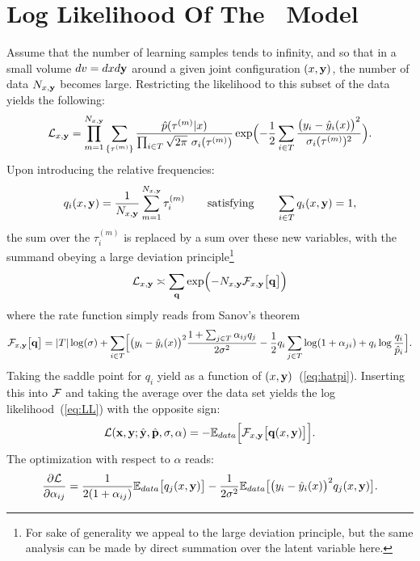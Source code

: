 \chapter{Log Likelihood Of The \XX \ Model}\label{app:LL}
Assume that the number of learning samples tends to infinity, and so that in a small volume $dv = dxd{\bf y}$ around a given  joint configuration $(x,{\bf y})$,
the number of data $N_{x,{\bf y}}$ becomes large. Restricting the likelihood to this subset of the data yields the following:
\[
{\cal L}_{x,{\bf y}} = \prod_{m=1}^{N_{x,{\bf y}}} \sum_{\{\tau^{(m)}\}} 
\frac{\hat p(\tau^{(m)}\vert x)}{\prod_{i\in T}\sqrt{2\pi}\ \sigma_i(\tau^{(m)})}
\exp\Bigl(-\frac{1}{2}\sum_{i\in T}\frac{\bigl(y_i-\hat y_i(x)\bigr)^2}{\sigma_i(\tau^{(m)})^2}\Bigr).
\]
Upon introducing the relative frequencies:
\[
q_i(x,{\bf y}) = \frac{1}{N_{x,{\bf y}}}\sum_{m=1}^{N_{x,{\bf y}}} \tau_i^{(m)} 
\qquad\text{satisfying}\qquad 
\sum_{i\in T} q_i(x,{\bf y}) = 1,
\]
the sum over the $\tau_i^{(m)}$ is replaced by a sum over these new variables, with the summand 
obeying a large deviation principle\footnote{For sake of generality we appeal to the large 
deviation principle, but the same analysis can be made by direct summation over the 
latent variable here.} 
\[
{\cal L}_{x,{\bf y}} \asymp \sum_{{\bf q}} 
\exp\Bigl(-N_{x,{\bf y}} {\cal F}_{x,{\bf y}}\bigl[{\bf q}\bigr]\Bigr)
\]
where the rate function simply reads from Sanov's theorem
\[
{\cal F}_{x,{\bf y}}\bigl[{\bf q}\bigr] = \vert T\vert\log(\sigma)+
\sum_{i\in T}\Bigl[\bigl(y_i-\hat y_i(x)\bigr)^2\frac{1+\sum_{j\in T}\alpha_{ij}q_j}{2\sigma^2}
-\frac{1}{2}q_i\sum_{j\in T}\log(1+\alpha_{ji})+q_i\log\frac{q_i}{\hat p_i}\Bigr].
\]
Taking the saddle point for $q_i$ yield as a function of $(x,{\bf y})$~(\cref{eq:hatpi}). 
Inserting this into ${\cal F}$ and taking the average over the data set yields the log 
likelihood~(\cref{eq:LL}) with the opposite sign:
\[
{\cal L}({\bf x},{\bf y};\hat {\bf y},\hat{\bf p},\sigma,\alpha) = -{\mathbb E}_{data}\Bigl[{\cal F}_{x,{\bf y}}\bigl[{\bf q}(x,{\bf y})\bigr]\Bigr].
\]
%
The optimization with respect to $\alpha$ reads:
\[
\frac{\partial{\cal L}}{\partial \alpha_{ij}} = \frac{1}{2(1+\alpha_{ij})}{\mathbb E}_{data}\bigl[q_j(x,{\bf y})\bigr]-\frac{1}{2\sigma^2}
{\mathbb E}_{data}\bigl[\bigl(y_i-\hat y_i(x)\bigr)^2q_j(x,{\bf y})\bigr].
\]
